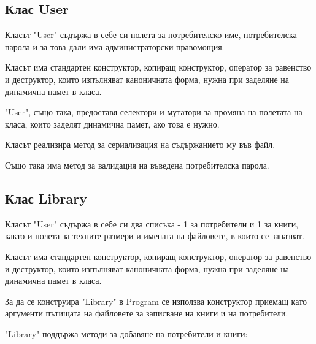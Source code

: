 \subsection{Клас User}

Класът "User" съдържа в себе си полета за потребителско име, потребителска парола и за това дали има администраторски правомощия.


Класът има стандартен конструктор, копиращ конструктор, оператор за равенство и деструктор, които изпълняват каноничната форма, нужна при заделяне на динамична памет в класа.



"User", също така, предоставя селектори и мутатори за промяна на полетата на класа, които заделят динамична памет, ако това е нужно.



Класът реализира метод за сериализация на съдържанието му във файл.



Също така има метод за валидация на въведена потребителска парола.



\subsection{Клас Library}

Класът "User" съдържа в себе си два списъка - 1 за потребители и 1 за книги, както и полета за техните размери и имената на файловете, в които се запазват.


Класът има стандартен конструктор, копиращ конструктор, оператор за равенство и деструктор, които изпълняват каноничната форма, нужна при заделяне на динамична памет в класа.



За да се конструира "Library" в Program се използва конструктор приемащ като аргументи пътищата на файловете за записване на книги и на потребители.



"Library" поддържа методи за добавяне на потребители и книги:



